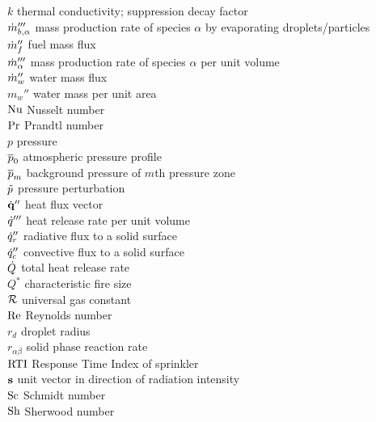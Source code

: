 \begin{tabbing}
$k$                       \> thermal conductivity; suppression decay factor \\
$\dot{m}_{b,\alpha}'''$       \> mass production rate of species $\alpha$ by evaporating droplets/particles \\
$\dot{m}_f''$                 \> fuel mass flux \\
$\dot{m}_\alpha'''$           \> mass production rate of species $\alpha$ per unit volume \\
$\dot{m}_w''$                 \> water mass flux  \\
$m_w''$                   \> water mass per unit area \\
$\hbox{Nu}$                     \> Nusselt number \\
$\hbox{Pr}$                     \> Prandtl number \\
$p$                       \> pressure \\
$\overline{p}_0$                   \> atmospheric pressure profile \\
$\overline{p}_m$                   \> background pressure of $m$th pressure zone \\
$\tilde{p}$                     \> pressure perturbation \\
$\dot{\bf q}''$                  \> heat flux vector \\
$\dot{q}'''$                  \> heat release rate per unit volume \\
$\dot{q}_r''$                 \> radiative flux to a solid surface \\
$\dot{q}_c''$                 \> convective flux to a solid surface \\
$\dot{Q}$                     \> total heat release rate \\
$Q^*$                     \> characteristic fire size \\
${\cal R}$                      \> universal gas constant \\
$\hbox{Re}$                     \> Reynolds number \\
$r_d$                     \> droplet radius \\
$r_{\alpha\beta}$         \> solid phase reaction rate \\
$\hbox{RTI}$              \> Response Time Index of sprinkler \\
${\bf s}$                     \> unit vector in direction of radiation intensity\\
$\hbox{Sc}$                     \> Schmidt number \\
$\hbox{Sh}$                     \> Sherwood number \\

\end{tabbing}

